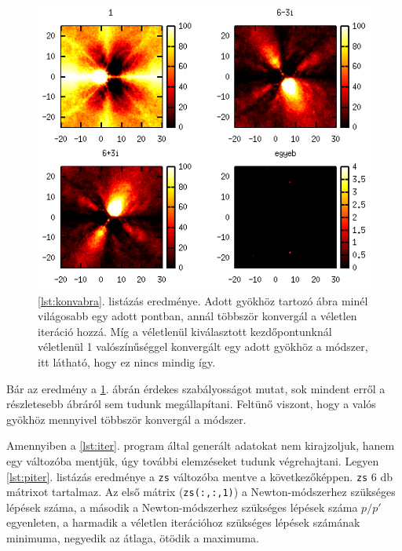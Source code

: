 \documentclass[a4paper,12pt]{report}
\begin{document}
				\begin{figure}[ht]
					\centering
					\includegraphics[scale=0.65]{Konv2.png}
					\caption{\ref{lst:konvabra}. listázás eredménye. Adott gyökhöz tartozó ábra minél világosabb egy adott pontban, annál többször konvergál a véletlen iteráció hozzá. Míg a véletlenül kiválasztott kezdőpontunknál véletlenül 1 valószínűséggel konvergált egy adott gyökhöz a módszer, itt látható, hogy ez nincs mindig így.} \label{fig:konv_el}
				\end{figure}
				
				Bár az eredmény a \ref{fig:konv_el}. ábrán érdekes szabályosságot mutat, sok mindent erről a részletesebb ábráról sem tudunk megállapítani. Feltünő viszont, hogy a valós gyökhöz mennyivel többször konvergál a módszer.
				
				Amennyiben a \ref{lst:iter}. program által generált adatokat nem kirajzoljuk, hanem egy változóba mentjük, úgy további elemzéseket tudunk végrehajtani. Legyen \ref{lst:piter}. listázás  eredménye a \texttt{zs} változóba mentve a következőképpen. \texttt{zs} 6 db mátrixot tartalmaz. Az első mátrix (\texttt{zs(:,:,1)}) a Newton-módszerhez szükséges lépések száma, a második a Newton-módszerhez szükséges lépések száma $p/p'$ egyenleten, a harmadik a véletlen iterációhoz szükséges lépések számának minimuma, negyedik az átlaga, ötödik a maximuma.
\end{document}
